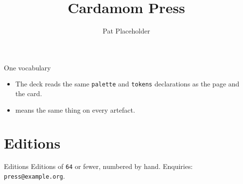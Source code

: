 \documentclass[aspectratio=169]{slides}
\title{Cardamom Press}
\author{Pat Placeholder}
\date{}
\begin{document}
\maketitle

\begin{frame}{One vocabulary}
  \begin{itemize}
    \item The deck reads the same \texttt{palette} and \texttt{tokens}
      declarations as the page and the card.
    \item {} means the same thing on every artefact.
  \end{itemize}
\end{frame}

\section{Editions}

\begin{frame}{Editions}
  Editions of \texttt{64} or fewer, numbered by hand.
  Enquiries: \texttt{press@example.org}.
\end{frame}
\end{document}
